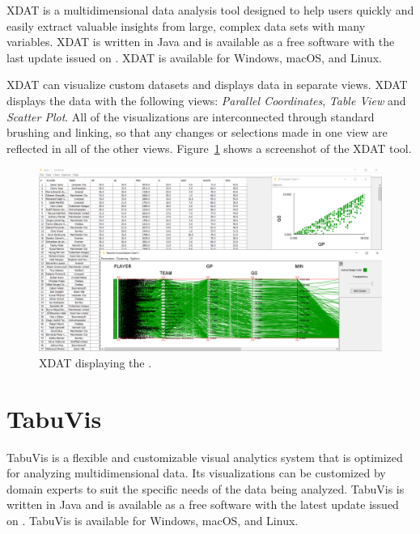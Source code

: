 XDAT \parencite{XDAT} is a multidimensional data analysis tool designed to
help users quickly and easily extract valuable insights from large,
complex data sets with many variables. XDAT is written in Java and is
available as a free software with the last update issued on
. XDAT is available for Windows, macOS, and
Linux.

XDAT can visualize custom datasets and displays data in separate views.
XDAT displays the data with the following views: \emph{Parallel
Coordinates}, \emph{Table View} and \emph{Scatter Plot}. All of the
visualizations are interconnected through standard brushing and linking,
so that any changes or selections made in one view are reflected in all of
the other views. Figure~\ref{fig:ScreenshotXDAT} shows a screenshot of the
XDAT tool.




\begin{figure}[tp]
\centering
\includegraphics[keepaspectratio,width=\linewidth,height=\halfh]
{images/screenshot-xdat.png}

\caption[XDAT]
{%
XDAT displaying the \cite{premierDataset}.
}
\label{fig:ScreenshotXDAT}
\end{figure}



\section{TabuVis}

TabuVis \parencite{nguyen2013tabuvis} is a flexible and customizable
visual analytics system that is optimized for analyzing multidimensional
data. Its visualizations can be customized by domain experts to suit the
specific needs of the data being analyzed. TabuVis is written in Java and
is available as a free software with the latest update issued on
. TabuVis is available for Windows, macOS, and
Linux.

